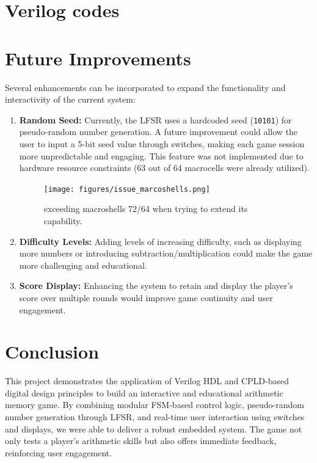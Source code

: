 \documentclass[10pt,a4paper,twocolumn,twoside]{tau-class/tau}
\begin{document}
	
\section{Verilog codes}
	
    
	



\section{Future Improvements}

Several enhancements can be incorporated to expand the functionality and interactivity of the current system:

\begin{enumerate}
    \item \textbf{Random Seed:} 
    Currently, the LFSR uses a hardcoded seed (\texttt{10101}) for pseudo-random number generation. A future improvement could allow the user to input a 5-bit seed value through switches, making each game session more unpredictable and engaging. This feature was not implemented due to hardware resource constraints (63 out of 64 macrocells were already utilized).
    \begin{figure}[h!]
        \centering
        \texttt{[image: figures/issue\_marcoshells.png]}
        \caption{exceeding macroshells 72/64 when trying to extend its capability.}
        \label{fig:circuitdiagram}
    \end{figure}

    \item \textbf{Difficulty Levels:}
    Adding levels of increasing difficulty, such as displaying more numbers or introducing subtraction/multiplication could make the game more challenging and educational.
    

    \item \textbf{Score Display:}
    Enhancing the system to retain and display the player's score over multiple rounds would improve game continuity and user engagement.

\end{enumerate}

\section{Conclusion}

This project demonstrates the application of Verilog HDL and CPLD-based digital design principles to build an interactive and educational arithmetic memory game. By combining modular FSM-based control logic, pseudo-random number generation through LFSR, and real-time user interaction using switches and displays, we were able to deliver a robust embedded system. The game not only tests a player's arithmetic skills but also offers immediate feedback, reinforcing user engagement.
\end{document}
